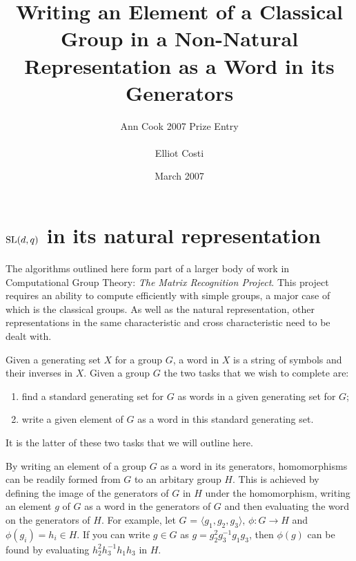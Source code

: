 \documentclass[12pt]{article}
\def\SL{{\rm SL}}
\begin{document}
\title{Writing an Element of a Classical Group in a Non-Natural Representation as a Word in its Generators}
\author{Ann Cook 2007 Prize Entry \\ \\ Elliot Costi}
\date{March 2007}
\maketitle

\newpage

\section{$\SL(d, q)$ in its natural representation}
\label{}

The algorithms outlined here form part of a larger body of work in Computational Group Theory: \textit{The Matrix Recognition Project}. This project requires an ability to compute efficiently with simple groups, a major case of which is the classical groups. As well as the natural representation, other representations in the same characteristic and cross characteristic need to be dealt with.

Given a generating set $X$ for a group $G$, a word in $X$ is a string of symbols and their inverses in $X$. Given a group $G$ the two tasks that we wish to complete are:

\begin{enumerate}
\item find a standard generating set for $G$ as words in a given generating set for $G$;
\item write a given element of $G$ as a word in this standard generating set.

\end{enumerate}

It is the latter of these two tasks that we will outline here.

By writing an element of a group $G$ as a word in its generators, homomorphisms can be readily formed from $G$ to an arbitary group $H$. This is achieved by defining the image of the generators of $G$ in $H$ under the homomorphism, writing an element $g$ of $G$ as a word in the generators of $G$ and then evaluating the word on the generators of $H$.
For example, let $G$ = $\langle g_1, g_2, g_3 \rangle$, $\phi : G \rightarrow H$ and $\phi(g_i) = h_i \in H$. If you can write $g \in G$ as $g = g_2^2 g_3^{-1} g_1 g_3$, then $\phi(g)$ can be found by evaluating $h_2^2 h_3^{-1} h_1 h_3$ in $H$.
\\
\end{document}
